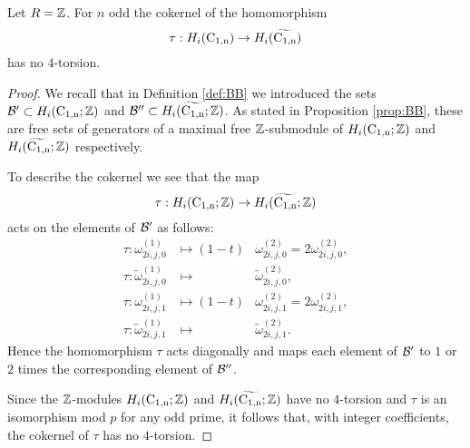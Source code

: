 \begin{lem} \label{lem:tau_torsion}
Let $R = \mathbb{Z}$. For $n$ odd the cokernel of the homomorphism
$$\tau:H_i(\operatorname{C_{1,n}}) \to H_i(\widetilde{\operatorname{C_{1,n}}})
$$
has no $4$-torsion.
\end{lem}
\begin{proof}
We recall that in Definition \ref{def:BB} we introduced the sets $\mathcal{B}' \subset H_i(\operatorname{C_{1,n}};\mathbb{Z})$  and $\mathcal{B}'' \subset H_i(\widetilde{\operatorname{C_{1,n}}};\mathbb{Z})$. As stated in Proposition \ref{prop:BB}, these are free sets of generators of a maximal free $\mathbb{Z}$-submodule of $H_i(\operatorname{C_{1,n}};\mathbb{Z})$  and $H_i(\widetilde{\operatorname{C_{1,n}}};\mathbb{Z})$ respectively.

To describe the cokernel we see that the map 
$$\tau:H_i(\operatorname{C_{1,n}}; \mathbb{Z}) \to H_i(\widetilde{\operatorname{C_{1,n}}}; \mathbb{Z})
$$ 
acts on the elements of $\mathcal{B}'$ as follows:
\begin{eqnarray}
\tau: \omega_{2i,j,0}^{(1)} & \mapsto  (1 - t ) &\omega_{2i,j,0}^{(2)} = 2 \omega_{2i,j,0}^{(2)}, \label{rat_gen1}\\
\tau: \widetilde{\omega}_{2i,j,0}^{(1)} & \mapsto \phantom{(1-t)}& \widetilde{\omega}_{2i,j,0}^{(2)},\label{rat_gen2}\\
\tau: \omega_{2i,j,1}^{(1)}  & \mapsto (1 - t )& \omega_{2i,j,1}^{(2)} = 2 \omega_{2i,j,1}^{(2)},\label{rat_gen3}\\
\tau: \widetilde{\omega}_{2i,j,1}^{(1)} & \mapsto \phantom{(1-t)}& \widetilde{\omega}_{2i,j,1}^{(2)}.\label{rat_gen4}
\end{eqnarray}
Hence the homomorphism $\tau$ acts diagonally and maps each element of $\mathcal{B}'$ to $1$ or $2$ times the corresponding element of $\mathcal{B}''$.

Since the $\mathbb{Z}$-modules $H_i(\operatorname{C_{1,n}};\mathbb{Z})$ and $H_i(\widetilde{\operatorname{C_{1,n}}};\mathbb{Z})$ have no $4$-torsion and  $\tau$ is an isomorphism mod $p$ for any odd prime, it follows that, with integer coefficients, the cokernel of $\tau$ has no $4$-torsion.
\end{proof}




